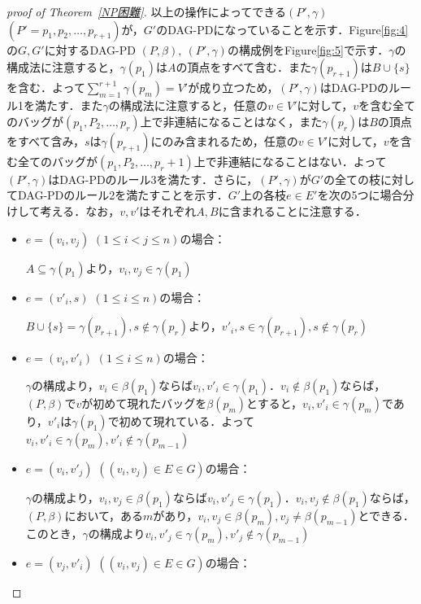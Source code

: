 \documentclass[master]{kuisthesis}		%
\theoremstyle{plain}
\theoremstyle{definition}
\begin{document}
\begin{proof}[proof of Theorem~\ref{NP困難}]
    以上の操作によってできる$(P', \gamma)$ $(P' = p_1, p_2, \dots, p_{r+1})$が，$G'$のDAG-PDになっていることを示す．Figure\ref{fig:4}の$G, G'$に対するDAG-PD $(P, \beta),\ (P', \gamma)$の構成例をFigure\ref{fig:5}で示す．$\gamma$の構成法に注意すると，$\gamma(p_1)$は$A$の頂点をすべて含む．また$\gamma(p_{r+1})$は$B \cup \{s\}$を含む．よって$\sum_{m=1}^{r+1} \gamma(p_m) = V'$が成り立つため，$(P', \gamma)$はDAG-PDのルール1を満たす．また$\gamma$の構成法に注意すると，任意の$v \in V'$に対して，$v$を含む全てのバッグが$(p_1, P_2, \dots, p_r)$上で非連結になることはなく，また$\gamma(p_r)$は$B$の頂点をすべて含み，$s$は$\gamma(p_{r+1})$にのみ含まれるため，任意の$v \in V'$に対して，$v$を含む全てのバッグが$(p_1, P_2, \dots, p_r+1)$上で非連結になることはない．よって$(P', \gamma)$はDAG-PDのルール3を満たす．さらに，$(P', \gamma)$が$G'$の全ての枝に対してDAG-PDのルール2を満たすことを示す．$G'$上の各枝$e \in E'$を次の5つに場合分けして考える．なお，$v, v'$はそれぞれ$A, B$に含まれることに注意する．

    \begin{itemize}
        \item $e = (v_i, v_j)$ $(1 \leq i < j \leq n)$の場合：
        
        $A \subseteq \gamma(p_1)$より，$v_i, v_j \in \gamma(p_1)$
        \item $e = (v'_i, s)$ $(1 \leq i \leq n)$の場合：
        
        $B \cup \{s\} = \gamma(p_{r+1}), s \notin \gamma(p_r)$より，$v'_i, s \in \gamma(p_{r+1}), s \notin \gamma(p_r)$
        \item $e = (v_i, v'_i)$ $(1 \leq i \leq n)$の場合：
        
        $\gamma$の構成より，$v_i \in \beta(p_1)$ならば$v_i, v'_i \in \gamma(p_1)$．$v_i \notin \beta(p_1)$ならば，$(P, \beta)$で$v$が初めて現れたバッグを$\beta(p_m)$とすると，$v_i, v'_i \in \gamma(p_m)$であり，$v'_i$は$\gamma(p_1)$で初めて現れている．よって$v_i, v'_i \in \gamma(p_m), v'_i \notin \gamma(p_{m-1})$
        \item $e = (v_i, v'_j)$ $((v_i, v_j) \in E \in G)$の場合：
        
        $\gamma$の構成より，$v_i, v_j \in \beta(p_1)$ならば$v_i, v'_j \in \gamma(p_1)$．$v_i, v_j \notin \beta(p_1)$ならば，$(P, \beta)$において，ある$m$があり，$v_i, v_j \in \beta(p_m), v_j \neq \beta(p_{m-1})$とできる．このとき，$\gamma$の構成より$v_i, v'_j \in \gamma(p_m), v'_j \notin \gamma(p_{m-1})$
        \item $e = (v_j, v'_i)$ $((v_i, v_j) \in E \in G)$の場合：
        

\end{itemize}
\end{proof}
\end{document}
